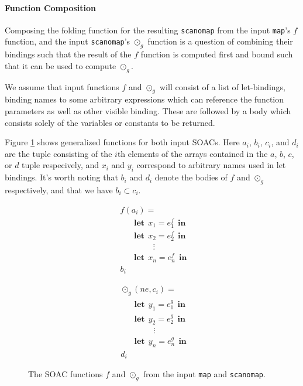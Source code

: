 \documentclass[11pt]{article}
\newcommand\lett{\phantom{-}\:\:\mathbf{let}\:\:}
\newcommand\inn{\:\:\mathbf{in}\:\:}
\begin{document}
\paragraph{Function Composition}
\setcounter{equation}{0}
Composing the folding function for the resulting \texttt{scanomap} from the input \texttt{map}'s $f$ function, and the input \texttt{scanomap}'s $\odot_g$ function is a question of combining their
 bindings such that the result of the $f$ function is computed first and bound such that it can be used to compute $\odot_g$.

We assume that input functions $f$ and $\odot_g$ will consist of a list of let-bindings, binding names to some arbitrary expressions which can reference the function parameters as well as
 other visible binding. These are followed by a body which consists solely of the variables or constants to be returned.

 Figure \ref{fig:bothfuns} shows generalized functions for both
 input SOACs. Here $a_i$, $b_i$, $c_i$, and $d_i$ are the tuple consisting of the $i$th elements of the arrays contained in the $a$, $b$, $c$, or $d$ tuple respecively, and $x_i$ and $y_i$ correspond
 to arbitrary names used in let bindings. It's worth noting that $b_i$ and $d_i$ denote the bodies of $f$ and $\odot_g$ respectively, and that we have $b_i \subset c_i$.
 \begin{figure}[hb!]

   \begin{mdframed}
 \begin{minipage}{0.5\linewidth}
     \centering

       \begin{align*}
         &f(a_i) = \\
         &\lett x_1 = e_1^f \inn\\
         &\lett x_2 = e_2^f \inn\\
         &\phantom{----}\vdots\\
         &\lett x_n = e_n^f \inn\\
         &b_i
       \end{align*}

     \label{fig:mapf}
 \end{minipage}
 \begin{minipage}{0.5\linewidth}
     \centering

     \begin{align*}
       &\odot_g(ne, c_i) = \\
       &\lett y_1 = e_1^g \inn\\
       &\lett y_2 = e_2^g \inn\\
       &\phantom{----}\vdots\\
       &\lett y_n = e_n^g \inn\\
       &d_i
     \end{align*}

     \label{fig:odotg}
   \end{minipage}

     \end{mdframed}
     \caption{The SOAC functions $f$ and $\odot_g$ from the input
       \texttt{map} and \texttt{scanomap}.}
     \label{fig:bothfuns}
\end{figure}
\end{document}
